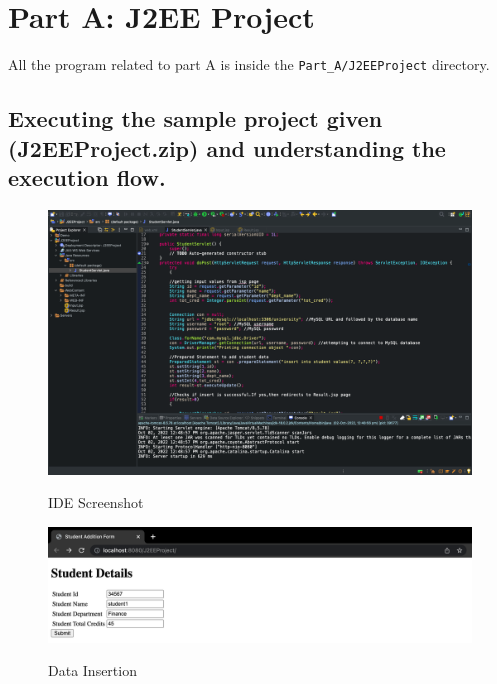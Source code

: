 \documentclass[12pt]{article}
\let\oldtexttt\texttt
\renewcommand{\texttt}[1]{
  \colorbox{bgcolor}{\oldtexttt{#1}}
  }
\begin{document}
\begin{titlingpage}
\maketitle
\end{titlingpage}

\newpage

\section{Part A: J2EE Project}

All the program related to part A is inside the \texttt{Part\_A/J2EEProject} directory.

\subsection{Executing the sample project given (J2EEProject.zip) and understanding the execution flow.}

\begin{figure}[!hbt]
    \centering
    \includegraphics[scale=0.3]{screenshots/a11.png}
    \label{fig:my_label1}
    \caption{IDE Screenshot}
\end{figure}

\begin{figure}[!hbt]
    \centering
    \includegraphics[scale=0.42]{screenshots/a12.png}
    \label{fig:my_label1}
    \caption{Data Insertion}
\end{figure}
\end{document}
